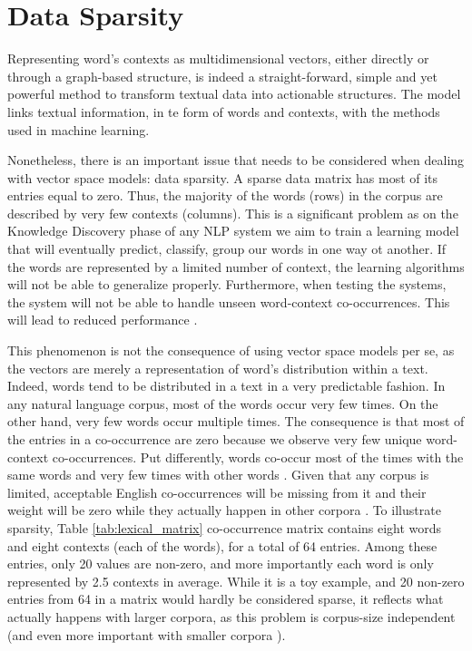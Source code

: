 \section{Data Sparsity}
Representing word's contexts as multidimensional  vectors, either directly or through a graph-based structure, is indeed a straight-forward, simple and  yet powerful method to transform textual data into actionable structures. The model links  textual information, in te form of words and contexts, with the methods used in machine learning.

Nonetheless, there is an important issue that needs to be considered when dealing with vector space models: data sparsity.  A sparse data matrix has most of its entries equal to zero. Thus, the majority of the words (rows) in the corpus are described by very few contexts (columns). This is a significant problem as on the Knowledge Discovery phase of any NLP system we aim to train a learning model that will eventually predict, classify, group our words in one way ot another. If the words are represented by a limited number of context, the learning algorithms will not be able to generalize properly. Furthermore, when testing the systems, the system will not be able to handle unseen word-context co-occurrences. This will lead to reduced performance \cite{phan2008learning}.

This phenomenon is not the consequence of using vector space models per se,  as the vectors are merely a representation of  word's distribution within a text. Indeed, words tend to be distributed in a text in a very predictable fashion. In any natural language corpus, most of the words occur very few times. On the other hand, very few words occur multiple times. The consequence is that most of the entries in a co-occurrence are zero because we observe very few unique word-context co-occurrences. Put differently, words co-occur most of the times with the same words and  very few times with other words \cite{sahlgren2006word}. Given that any corpus is limited, acceptable English co-occurrences will be missing from it and their weight will be zero while they  actually happen in other corpora \cite{JurafskyM17}. To illustrate sparsity, Table \ref{tab:lexical_matrix} co-occurrence matrix contains eight words and eight contexts (each of the words), for a total of 64 entries. Among these entries, only 20 values are non-zero, and more importantly each word is only represented  by 2.5 contexts in average. While it is a toy example, and 20 non-zero entries from 64 in a matrix would hardly be considered sparse, it reflects what actually happens with larger corpora, as this problem is corpus-size independent (and even more important with smaller corpora \cite{perinet2015}). 

